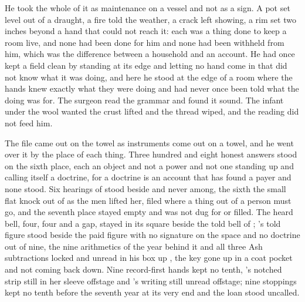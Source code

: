 He took the whole of it as maintenance on a vessel and not as a sign. A pot set level out of a draught, a fire told the weather, a crack left showing, a rim set two inches beyond a hand that could not reach it: each was a thing done to keep a room live, and none had been done for him and none had been withheld from him, which was the difference between a household and an account. He had once kept a field clean by standing at its edge and letting no hand come in that did not know what it was doing, and here he stood at the edge of a room where the hands knew exactly what they were doing and had never once been told what the doing was for. The surgeon read the grammar and found it sound. The infant under the wool wanted the crust lifted and the thread wiped, and the reading did not feed him.

\scenebreak

The file came out on the towel as instruments come out on a towel, and he went over it by the place of each thing. Three hundred and eight honest answers stood on the sixth place, each an object and not a power and not one standing up and calling itself a doctrine, for a doctrine is an account that has found a payer and none stood. Six hearings of  stood beside and never among, the sixth the small flat knock out of  as the men lifted her, filed where a thing out of a person must go, and the seventh place stayed empty and was not dug for or filled. The heard bell, four, four and a gap, stayed in its square beside the told bell of ; 's told figure stood beside the paid figure with no signature on the space and no doctrine out of nine, the nine arithmetics of the year behind it and all three Ash subtractions locked and unread in his box up , the key gone up in a coat pocket and not coming back down. Nine record-first hands kept no tenth, 's notched strip still in her sleeve offstage and 's writing still unread offstage; nine stoppings kept no tenth before the seventh year at its very end and the loan stood uncalled.

